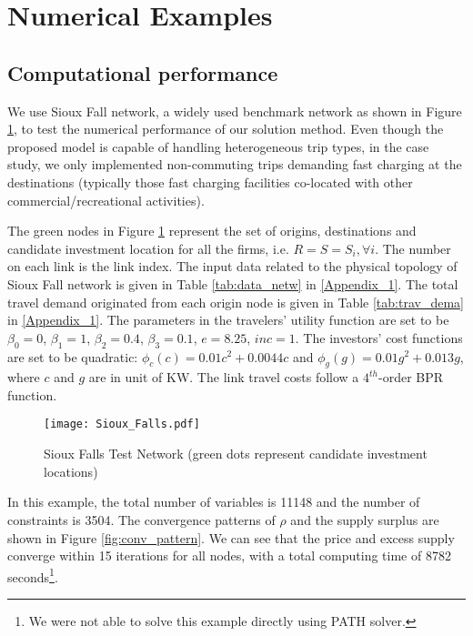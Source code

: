 
\section{Numerical Examples}

\subsection{Computational performance}\label{sec:comp_perf}

We use Sioux Fall network, a widely used benchmark network as shown in Figure \ref{fig:siou_fall}, to test the numerical performance of our solution method. Even though the proposed model is capable of handling heterogeneous trip types, in the case study, we only implemented non-commuting trips demanding fast charging at the destinations (typically those fast charging facilities co-located with other commercial/recreational activities).   

The green nodes in Figure \ref{fig:siou_fall} represent the set of origins, destinations and candidate investment location for all the firms, i.e. $R = S = S_i, \forall i$.  The number on each link is the link index.  The input data related to the physical topology of Sioux Fall network is given in Table \ref{tab:data_netw} in \ref{Appendix_1}.  The total travel demand originated from each origin node is given in Table \ref{tab:trav_dema} in \ref{Appendix_1}.  The parameters in the travelers' utility function are set to be   $\beta_0=0$, $\beta_1=1$, $\beta_2=0.4$, $\beta_3=0.1$, $e=8.25$,    $inc=1$.  The investors' cost functions are set to be quadratic: $\phi_c(c) = 0.01c^2 + 0.0044c$ and $\phi_g(g) = 0.01g^2 + 0.013g$, where $c$ and $g$ are in unit of KW.  The link travel costs follow a $4^{th}$-order BPR function.


\begin{figure}[htbp]
\begin{center}
    \texttt{[image: Sioux\_Falls.pdf]}
\caption{Sioux Falls Test Network (green dots represent candidate investment locations)}
\label{fig:siou_fall}
\end{center}
\end{figure}

In this example, the total number of variables is 11148 and the number of constraints is 3504.  The convergence patterns of $\rho$ and the supply surplus are shown in Figure \ref{fig:conv_pattern}. We can see that the price and excess supply converge within 15 iterations for all nodes, with a total computing time of 8782 seconds\footnote{We were not able to solve this example directly using PATH solver.}.  

